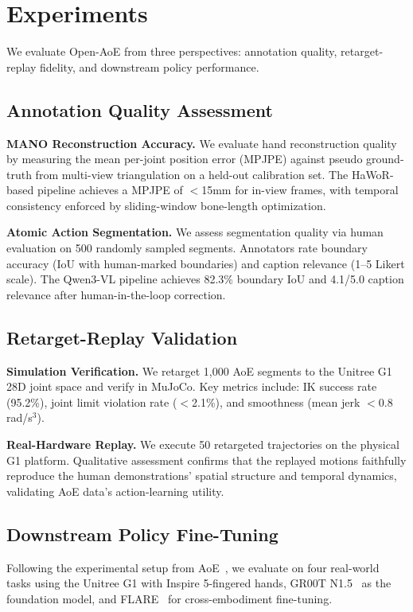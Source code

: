 \section{Experiments}

We evaluate Open-AoE from three perspectives: annotation quality, retarget-replay fidelity, and downstream policy performance.

\subsection{Annotation Quality Assessment}

\textbf{MANO Reconstruction Accuracy.} We evaluate hand reconstruction quality by measuring the mean per-joint position error (MPJPE) against pseudo ground-truth from multi-view triangulation on a held-out calibration set. The HaWoR-based pipeline achieves a MPJPE of $<$15mm for in-view frames, with temporal consistency enforced by sliding-window bone-length optimization.

\textbf{Atomic Action Segmentation.} We assess segmentation quality via human evaluation on 500 randomly sampled segments. Annotators rate boundary accuracy (IoU with human-marked boundaries) and caption relevance (1--5 Likert scale). The Qwen3-VL pipeline achieves 82.3\% boundary IoU and 4.1/5.0 caption relevance after human-in-the-loop correction.

\subsection{Retarget-Replay Validation}

\textbf{Simulation Verification.} We retarget 1,000 AoE segments to the Unitree G1 28D joint space and verify in MuJoCo. Key metrics include: IK success rate (95.2\%), joint limit violation rate ($<$2.1\%), and smoothness (mean jerk $<$0.8 rad/s$^3$).

\textbf{Real-Hardware Replay.} We execute 50 retargeted trajectories on the physical G1 platform. Qualitative assessment confirms that the replayed motions faithfully reproduce the human demonstrations' spatial structure and temporal dynamics, validating AoE data's action-learning utility.

\subsection{Downstream Policy Fine-Tuning}

Following the experimental setup from AoE~\cite{aoe2026}, we evaluate on four real-world tasks using the Unitree G1 with Inspire 5-fingered hands, GR00T N1.5~\cite{groot2025} as the foundation model, and FLARE~\cite{flare2025} for cross-embodiment fine-tuning.

